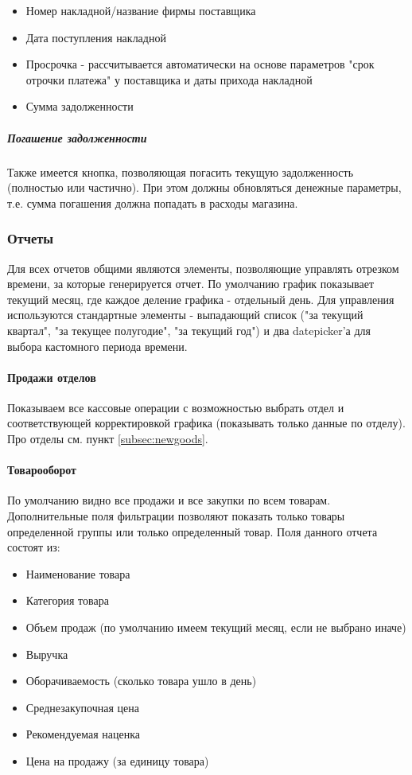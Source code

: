 \documentclass[DIV=calc, paper=a4, fontsize=11pt]{scrartcl} %
\begin{document}
\begin{itemize}
	\item Номер накладной/название фирмы поставщика
	\item Дата поступления накладной
	\item Просрочка - рассчитывается автоматически на основе параметров "срок отрочки платежа" у поставщика и даты прихода накладной
	\item Сумма задолженности
\end{itemize}

\subparagraph{Погашение задолженности}
Также имеется кнопка, позволяющая погасить текущую задолженность (полностью или частично). При этом должны обновляться денежные параметры, т.е. сумма погашения должна попадать в расходы магазина.


\subsubsection{Отчеты}
Для всех отчетов общими являются элементы, позволяющие управлять отрезком времени, за которые генерируется отчет. По умолчанию график показывает текущий месяц, где каждое деление графика - отдельный день. Для управления используются стандартные элементы - выпадающий список ("за текущий квартал", "за текущее полугодие", "за текущий год") и два datepicker'а для выбора кастомного периода времени.

\paragraph{Продажи отделов}
Показываем все кассовые операции с возможностью выбрать отдел и соответствующей корректировкой графика (показывать только данные по отделу). Про отделы см. пункт \ref{subsec:newgoods}.

\paragraph{Товарооборот}
По умолчанию видно все продажи и все закупки по всем товарам. Дополнительные поля фильтрации позволяют показать только товары определенной группы или только определенный товар.
Поля данного отчета состоят из:
\begin{itemize}
	\item Наименование товара
	\item Категория товара
	\item Объем продаж (по умолчанию имеем текущий месяц, если не выбрано иначе)
	\item Выручка
	\item Оборачиваемость (сколько товара ушло в день)
	\item Среднезакупочная цена
	\item Рекомендуемая наценка
	\item Цена на продажу (за единицу товара)
\end{itemize}
\end{document}
